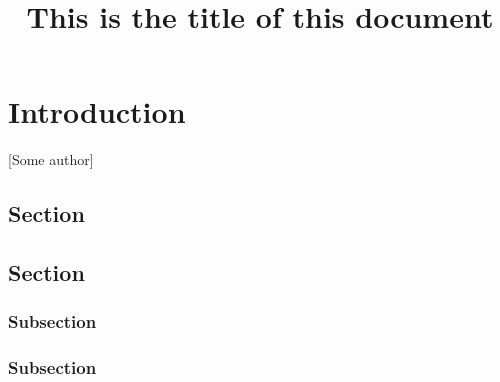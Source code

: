 \documentclass{RVTM}
\title{This is the title of this document}
\begin{document}
\rvtmtoc


\setcounter{page}{18}
\chapter{Introduction}

[Some author]

\section{Section}


\lipsum[1]
 
\section{Section} 
 
\subsection{Subsection}


\lipsum[2]

\hdottedline%
\begin{multicols}{2}
	\lipsum[3]
\end{multicols}
  


\subsection{Subsection}

\lipsum[4]



\lipsum[1]


\begin{framedpage}
	{\centering%
	}
	\lipsum[1]
\end{framedpage}

\begin{blackpage}
	\lipsum[1]
\end{blackpage}
\end{document}
